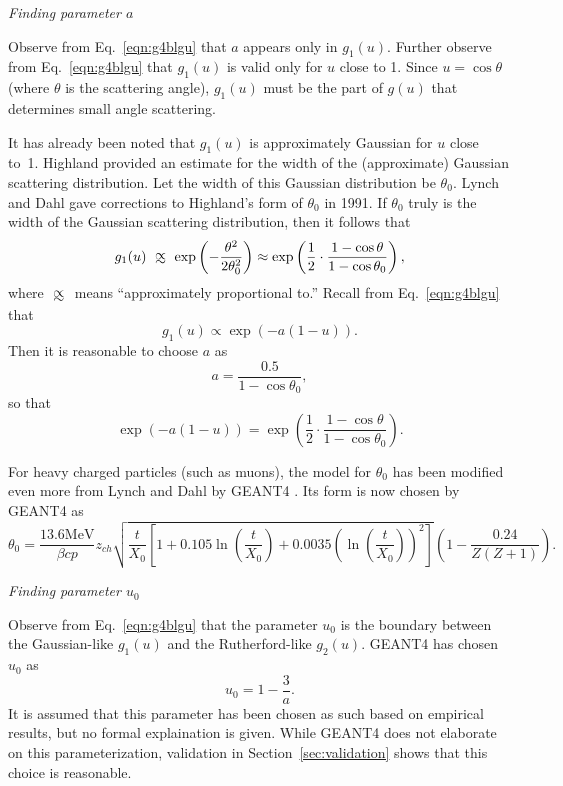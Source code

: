 \noindent \textit{\large{Finding parameter $a$}}

Observe from Eq.~\eqref{eqn:g4blgu} that $a$ appears only in $g_1(u)$. Further observe from Eq.~\eqref{eqn:g4blgu} that $g_1(u)$ is valid only for $u$ close to 1. Since $u=\cos\theta$ (where $\theta$ is the scattering angle), $g_1(u)$ must be the part of $g(u)$ that determines small angle scattering. 

It has already been noted that $g_1(u)$ is approximately Gaussian for $u$ close to~1. Highland \cite{highland} provided an estimate for the width of the (approximate) Gaussian scattering distribution. Let the width of this Gaussian distribution be $\theta_0$. Lynch and Dahl \cite{lynchdahl} gave corrections to Highland's form of $\theta_0$ in 1991. If $\theta_0$ truly is the width of the Gaussian scattering distribution, then it follows that
%
\begin{equation}\nonumber
g_1(u) \approxprop \exp{\left(-\frac{\theta^2}{2\theta_0^2}\right)} \approx \exp\left(\frac{1}{2}\cdot\frac{1-\cos\theta}{1-\cos\theta_0}\right),
\end{equation}
%
where $\approxprop$ means ``approximately proportional to.'' Recall from Eq.~\eqref{eqn:g4blgu} that
\begin{equation}\nonumber
g_1(u)\propto \exp{(-a(1-u))}.
\end{equation}
Then it is reasonable to choose $a$ as
%
\begin{equation}
a=\frac{0.5}{1-\cos\theta_0},
\label{eqn:geanta}
\end{equation}
%
so that
%
\begin{equation}\nonumber
\exp{(-a(1-u))}=\exp\left(\frac{1}{2}\cdot\frac{1-\cos\theta}{1-\cos\theta_0}\right).
\end{equation}
%

 For heavy charged particles (such as muons), the model for $\theta_0$ has been modified even more from Lynch and Dahl by GEANT4 \cite{geant4}. Its form is now chosen by GEANT4 \cite{geant4} as
%
\begin{equation}\label{g4bltheta0}
\theta_0=\frac{13.6 \text{MeV}}{\beta c p}z_{ch}\sqrt{\frac{t}{X_0}\left[ 1+0.105\ln\left(\frac{t}{X_0}\right)+0.0035\left(\ln\left(\frac{t}{X_0}\right)\right)^2 \right]}\left(1-\frac{0.24}{Z(Z+1)}\right).
\end{equation}

\noindent \textit{\large{Finding parameter $u_0$}}

Observe from Eq.~\eqref{eqn:g4blgu} that the parameter $u_0$ is the boundary between the Gaussian-like $g_1(u)$ and the Rutherford-like $g_2(u)$. GEANT4 \cite{geant4} has chosen $u_0$ as
\begin{equation}
u_0=1-\frac{3}{a}.
\label{eqn:geantu0}
\end{equation}
It is assumed that this parameter has been chosen as such based on empirical results, but no formal explaination is given. While GEANT4 \cite{geant4} does not elaborate on this parameterization, validation in Section~\ref{sec:validation} shows that this choice is reasonable.

